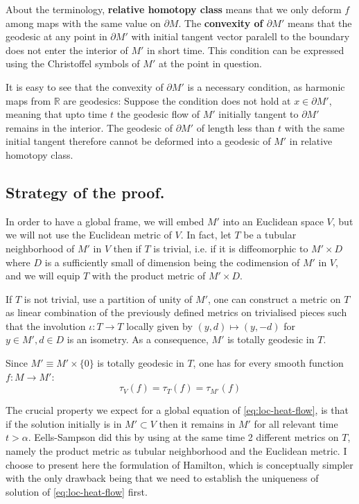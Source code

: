 About the terminology, \textbf{relative homotopy class} means that we only deform \(f\) among
maps with the same value on \(\partial M\). The \textbf{convexity of \(\partial M'\)} means
that the geodesic at any point in \(\partial M'\) with initial tangent vector paralell
to the boundary does not enter the interior of \(M'\) in short time. This condition can be expressed
using  the Christoffel symbols of \(M'\) at the point in question.

It is easy to see that the convexity of \(\partial M'\) is a necessary condition, as
harmonic maps from \(\mathbb{R}\) are geodesics: Suppose the condition does not hold at
\(x\in \partial M'\), meaning that upto time \(t\) the geodesic flow of \(M'\) initially tangent to
\(\partial M'\) remains in the interior. The geodesic of \(\partial M'\) of length
less than \(t\) with the same initial tangent therefore cannot be deformed into a
geodesic of \(M'\) in relative homotopy class. 

\subsection{Strategy of the proof.}
\label{sec:orgcd4af9e}
In order to have a global frame, we will embed \(M'\) into an Euclidean space \(V\),
but we will not use the Euclidean metric of \(V\). In fact, let \(T\) be a tubular
neighborhood of \(M'\) in \(V\) then if \(T\) is trivial, i.e. if it is diffeomorphic to \(M'\times D\)
where \(D\) is a sufficiently small of dimension being the codimension of \(M'\) in \(V\), and we will equip \(T\) with the product metric of \(M'\times D\). 

If \(T\) is not trivial, use a partition of unity of \(M'\), one can construct a metric on \(T\)
as linear combination of the previously defined metrics on trivialised pieces such that
the involution \(\iota: T \longrightarrow T\) locally given by \((y,d)\mapsto (y,-d)\)
for \(y\in M', d\in D\) is an isometry. As a consequence, \(M'\) is totally geodesic
in \(T\).


Since \(M' \equiv M'\times \{0\}\) is totally geodesic in \(T\), one has for every smooth
function \(f: M \longrightarrow M'\):
\[
 \tau_V (f) = \tau_T(f) = \tau_{M'} (f)
\]

The crucial property we expect for a global equation of \eqref{eq:loc-heat-flow}, is that if
the solution initially is in \(M'\subset V\) then it remains in \(M'\) for all
relevant time \(t>\alpha\). Eells-Sampson \cite{eells_harmonic_1964} did this by using at
the same time 2 different metrics on \(T\), namely the product metric as tubular
neighborhood and the Euclidean metric. I choose to present here the formulation of
Hamilton, which is conceptually simpler with the only drawback being that we need to
establish the uniqueness of solution of \eqref{eq:loc-heat-flow} first.


